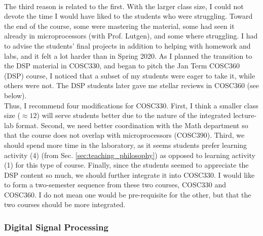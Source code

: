 \documentclass[../../main.tex]{subfiles}
\begin{document}
\\
\vspace{0.25cm}
The third reason is related to the first.  With the larger class size, I could not devote the time I would have liked to the students who were struggling.  Toward the end of the course, some were mastering the material, some had seen it already in microprocessors (with Prof. Lutgen), and some where struggling.  I had to advise the students' final projects in addition to helping with homework and labs, and it felt a lot harder than in Spring 2020.  As I planned the transition to the DSP material in COSC330, and began to pitch the Jan Term COSC360 (DSP) course, I noticed that a subset of my students were eager to take it, while others were not.  The DSP students later gave me stellar reviews in COSC360 (see below).
\\
\vspace{0.25cm}
Thus, I recommend four modifications for COSC330.  First, I think a smaller class size ($\approx 12$) will serve students better due to the nature of the integrated lecture-lab format.  Second, we need better coordination with the Math department so that the course does not overlap with microprocessors (COSC390).  Third, we should spend more time in the laboratory, as it seems students prefer learning activity (4) (from Sec. \ref{sec:teaching_philosophy}) as opposed to learning activity (1) for this type of course.  Finally, since the students seemed to appreciate the DSP content so much, we should further integrate it into COSC330.  I would like to form a two-semester sequence from these two courses, COSC330 and COSC360.  I do not mean one would be pre-requisite for the other, but that the two courses should be more integrated.

\subsubsection{Digital Signal Processing}
\end{document}
